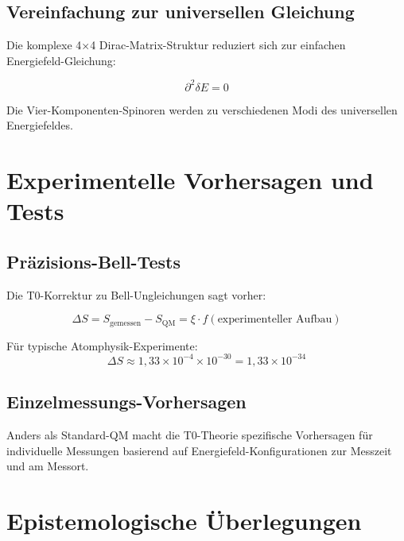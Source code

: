 \documentclass[12pt,a4paper]{report}
\begin{document}
	\subsection{Vereinfachung zur universellen Gleichung}
	\label{subsec:dirac_simplification}
	
	Die komplexe 4×4 Dirac-Matrix-Struktur reduziert sich zur einfachen Energiefeld-Gleichung:
	
	\begin{equation}
		\partial^2 \delta E = 0
	\end{equation}
	
	Die Vier-Komponenten-Spinoren werden zu verschiedenen Modi des universellen Energiefeldes.
	
	\section{Experimentelle Vorhersagen und Tests}
	\label{sec:experimental_predictions}
	
	\subsection{Präzisions-Bell-Tests}
	\label{subsec:precision_bell_tests}
	
	Die T0-Korrektur zu Bell-Ungleichungen sagt vorher:
	
	\begin{equation}
		\Delta S = S_{\text{gemessen}} - S_{\text{QM}} = \xi \cdot f(\text{experimenteller Aufbau})
	\end{equation}
	
	Für typische Atomphysik-Experimente:
	\begin{equation}
		\Delta S \approx 1,33 \times 10^{-4} \times 10^{-30} = 1,33 \times 10^{-34}
	\end{equation}
	
	\subsection{Einzelmessungs-Vorhersagen}
	\label{subsec:single_measurement_predictions}
	
	Anders als Standard-QM macht die T0-Theorie spezifische Vorhersagen für individuelle Messungen basierend auf Energiefeld-Konfigurationen zur Messzeit und am Messort.
	
	\section{Epistemologische Überlegungen}
	\label{sec:epistemological}
	
\end{document}
